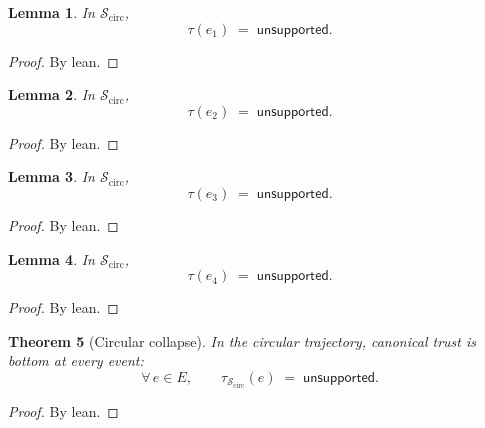 \documentclass[11pt,a4paper]{article}
\theoremstyle{plain}
\newtheorem{theorem}{Theorem}[section]
\newtheorem{lemma}[theorem]{Lemma}
\theoremstyle{definition}
\newcommand{\tauu}{\tau}
\begin{document}
\begin{lemma}\label{lem:circ-e1}
In $\mathcal{S}_{\mathrm{circ}}$,
\begin{equation}
  \tauu(e_1) \;=\; \mathsf{unsupported}.
\end{equation}
\end{lemma}

\begin{proof}
By lean.
\end{proof}

\begin{lemma}\label{lem:circ-e2}
In $\mathcal{S}_{\mathrm{circ}}$,
\begin{equation}
  \tauu(e_2) \;=\; \mathsf{unsupported}.
\end{equation}
\end{lemma}

\begin{proof}
By lean.
\end{proof}

\begin{lemma}\label{lem:circ-e3}
In $\mathcal{S}_{\mathrm{circ}}$,
\begin{equation}
  \tauu(e_3) \;=\; \mathsf{unsupported}.
\end{equation}
\end{lemma}

\begin{proof}
By lean.
\end{proof}

\begin{lemma}\label{lem:circ-e4}
In $\mathcal{S}_{\mathrm{circ}}$,
\begin{equation}
  \tauu(e_4) \;=\; \mathsf{unsupported}.
\end{equation}
\end{lemma}

\begin{proof}
By lean.
\end{proof}

\begin{theorem}[Circular collapse]\label{thm:circular-bot}
In the circular trajectory, canonical trust is bottom at every event:
\begin{equation}
  \forall\, e \in E,\qquad
  \tauu_{\mathcal{S}_{\mathrm{circ}}}(e) \;=\; \mathsf{unsupported}.
\end{equation}
\end{theorem}

\begin{proof}
By lean.
\end{proof}
\end{document}
